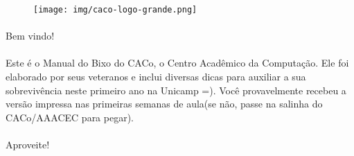 \documentclass[a4paper,10pt, twocolumn, twoside]{article}
\begin{document}
\onecolumn

\begin{figure}
    \centering
    \texttt{[image: img/caco-logo-grande.png]}
\end{figure}

\paragraph{}
Bem vindo!

\paragraph{}
Este é o Manual do Bixo do CACo, o Centro Acadêmico da Computação.
Ele foi elaborado por seus veteranos e inclui diversas dicas para auxiliar a sua
sobrevivência neste primeiro ano na Unicamp =).
Você provavelmente recebeu a versão impressa nas primeiras semanas de aula(se
não, passe na salinha do CACo/AAACEC para pegar).

\paragraph{}
Aproveite!

\clearpage

\tableofcontents
\clearpage
\onecolumn



\clearpage

\onecolumn



\clearpage



\clearpage

\twocolumn






















\end{document}
